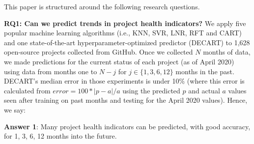 \documentclass[sigconf,anonymous,review]{acmart}
\begin{document}
 
 

 

  
\noindent
This paper is structured around the following  research questions.
  

 
 

 



\textbf{RQ1: Can we predict   trends in project health indicators?}
We apply five popular machine learning algorithms (i.e., KNN, SVR, LNR, RFT and CART) and one state-of-the-art hyperparameter-optimized predictor (DECART) to   1,628 open-source projects collected from GitHub. 
Once we collected $N$ months of data, we made predictions for  the current status of each project
(as of April 2020)
using data from months one to  $\mathit{N-j}$  for $\mathit{j\in\{1,3,6,12\}}$  months in the past.
 DECART's median error in those experiments is under 10\%
 (where  this error is  calculated from  $\mathit{error}=100*|p-a|/a$  using the predicted $p$ and actual $a$  values  seen after   training on past months and testing for the April 2020 values). Hence, we say:




\begin{blockquote}
\noindent
\textbf{Answer 1}: Many project health indicators can be predicted, with good accuracy, for 1, 3, 6, 12   months into the future.
\end{blockquote} 
\end{document}
